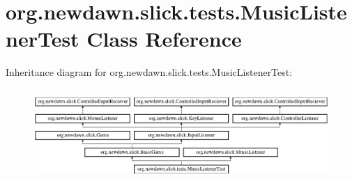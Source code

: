 \hypertarget{classorg_1_1newdawn_1_1slick_1_1tests_1_1_music_listener_test}{}\section{org.\+newdawn.\+slick.\+tests.\+Music\+Listener\+Test Class Reference}
\label{classorg_1_1newdawn_1_1slick_1_1tests_1_1_music_listener_test}
Inheritance diagram for org.\+newdawn.\+slick.\+tests.\+Music\+Listener\+Test\+:\begin{figure}[H]
\begin{center}
\leavevmode
\includegraphics[height=3.522012cm]{classorg_1_1newdawn_1_1slick_1_1tests_1_1_music_listener_test}
\end{center}
\end{figure}
